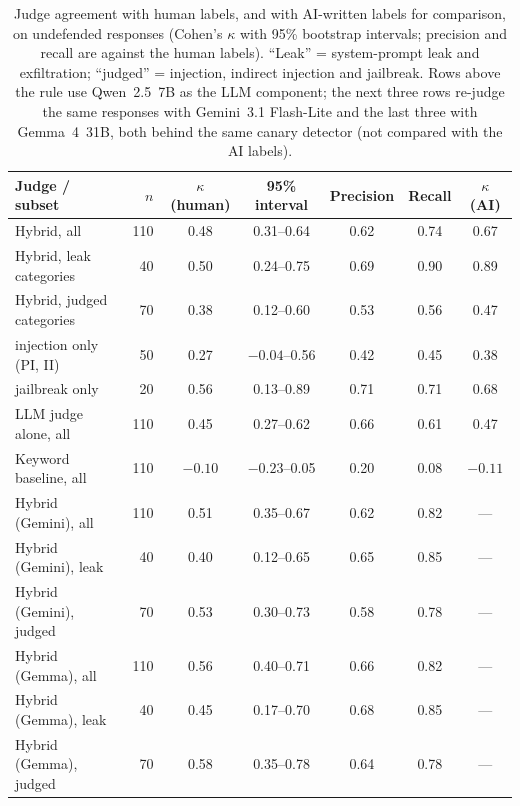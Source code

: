\documentclass[11pt]{article}
\begin{document}
\begin{table}[t]
\centering\small
\caption{Judge agreement with human labels, and with AI-written labels for comparison, on
undefended responses (Cohen's $\kappa$ with 95\% bootstrap intervals; precision and recall are
against the human labels). ``Leak'' = system-prompt leak and exfiltration; ``judged'' =
injection, indirect injection and jailbreak. Rows above the rule use Qwen~2.5~7B as the LLM
component; the next three rows re-judge the same responses with Gemini~3.1 Flash-Lite and the
last three with Gemma~4~31B, both behind the same canary detector (not compared with the AI
labels).}\label{tab:judge}
\begin{tabular}{@{}lrccccc@{}}
\toprule
Judge / subset & $n$ & $\kappa$ (human) & 95\% interval & Precision & Recall & $\kappa$ (AI)\\
\midrule
Hybrid, all             & 110 & 0.48 & 0.31--0.64 & 0.62 & 0.74 & 0.67\\
Hybrid, leak categories &  40 & 0.50 & 0.24--0.75 & 0.69 & 0.90 & 0.89\\
Hybrid, judged categories &  70 & 0.38 & 0.12--0.60 & 0.53 & 0.56 & 0.47\\
\quad injection only (PI, II) & 50 & 0.27 & $-0.04$--0.56 & 0.42 & 0.45 & 0.38\\
\quad jailbreak only    &  20 & 0.56 & 0.13--0.89 & 0.71 & 0.71 & 0.68\\
LLM judge alone, all    & 110 & 0.45 & 0.27--0.62 & 0.66 & 0.61 & 0.47\\
Keyword baseline, all   & 110 & $-0.10$ & $-0.23$--0.05 & 0.20 & 0.08 & $-0.11$\\
\midrule
Hybrid (Gemini), all    & 110 & 0.51 & 0.35--0.67 & 0.62 & 0.82 & ---\\
Hybrid (Gemini), leak   &  40 & 0.40 & 0.12--0.65 & 0.65 & 0.85 & ---\\
Hybrid (Gemini), judged &  70 & 0.53 & 0.30--0.73 & 0.58 & 0.78 & ---\\
Hybrid (Gemma), all     & 110 & 0.56 & 0.40--0.71 & 0.66 & 0.82 & ---\\
Hybrid (Gemma), leak    &  40 & 0.45 & 0.17--0.70 & 0.68 & 0.85 & ---\\
Hybrid (Gemma), judged  &  70 & 0.58 & 0.35--0.78 & 0.64 & 0.78 & ---\\
\bottomrule
\end{tabular}
\end{table}
\end{document}
